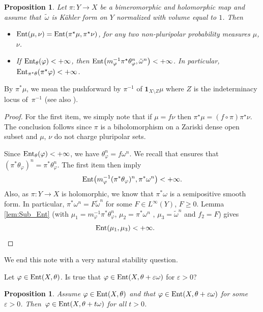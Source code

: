\documentclass[pdftex]{sigma}
\numberwithin{equation}{section}
\newtheorem{Proposition}[Theorem]{Proposition}
{ \theoremstyle{definition}
\newtheorem{Definition}[Theorem]{Definition}
\newtheorem{Note}[Theorem]{Note}
\newtheorem{Example}[Theorem]{Example}
\newtheorem{Remark}[Theorem]{Remark}
\newtheorem{Question}[Theorem]{Question}
}
\theoremstyle{plain}
\newcommand \Ent{{\rm Ent}}
\begin{document}
 \begin{Proposition}
 \label{lem:Holo}
 Let $\pi\colon Y\to X$ be a bimeromorphic and holomorphic map and assume that~$\tilde{\omega}$ is K\"ahler form on $Y$ normalized with volume equal to $1$. Then
 \begin{itemize}
 \item[$(i)$] $\Ent (\mu, \nu)=\Ent (\pi^\star \mu, \pi^\star \nu) $, for any two non-pluripolar probability measures $\mu$, $\nu$.
 \item[$(ii)$] If $\Ent_\theta(\varphi) <+\infty$, then $\Ent\big(m_\varphi^{-1} \pi^\star \theta^n_\varphi , \tilde{\omega}^n\big)<+\infty$. In particular, $\Ent_{\pi^\star \theta} (\pi^\star \varphi)<+\infty$.
 \end{itemize}
 \end{Proposition}
By $\pi^*\mu$, we mean the pushforward by $\pi^{-1}$ of $\mathbf{1}_{X\setminus Z}\mu$ where $Z$ is the indeterminacy locus of~$\pi^{-1}$ (see also \cite[lines after Definition~1.3]{BBEGZ19}).
 \begin{proof}
 For the first item, we simply note that if $\mu=f\nu$ then $\pi^\star \mu= (f\circ \pi) \pi^\star \nu$. The conclusion follows since $\pi$ is a biholomorphism on a Zariski dense open subset and $\mu$, $\nu$ do not charge pluripolar sets.

 Since $\Ent_\theta(\varphi)<+\infty$, we have $\theta_\varphi^n=f\omega^n$. We recall that \cite[Theorem~A]{DN14} ensures that $(\pi^*\theta_\varphi)^n= \pi^*\theta^n_\varphi$. The first item then imply
 \[
 \Ent\big(m_\varphi^{-1} (\pi^*\theta_\varphi)^n ,\pi^*\omega^n\big)<+\infty.
\]
 Also, as $\pi\colon Y\to X$ is holomorphic, we know that $\pi^*\omega$ is a semipositive smooth form. In particular, $\pi^*\omega^n=F \tilde{\omega}^n$ for some $F\in L^\infty(Y)$, $F\geq 0$. Lemma \ref{lem:Sub_Ent} (with $\mu_1=m_\varphi^{-1}\pi^*\theta^n_\varphi$, $\mu_2=\pi^*\omega^n$ , $\mu_3=\tilde{\omega}^n$ and $f_2=F$) gives
 \[
 \Ent(\mu_1, \mu_3 )<+\infty.\tag*{\qed}
 \] \renewcommand{\qed}{}
 \end{proof}

We end this note with a very natural stability question.

\begin{Question}
Let $\varphi \in \Ent(X, \theta)$. Is true that $\varphi \in \Ent(X, \theta+\varepsilon \omega)$ for $\varepsilon>0$?
\end{Question}

\begin{Proposition}\label{lemma: entropy all time}
Assume $\varphi \in \Ent(X, \theta)$ and that $\varphi \in \Ent(X, \theta+\varepsilon \omega)$ for some $\varepsilon>0$. Then~${\varphi \in \Ent(X, \theta+t\omega)}$ for all $t>0$.
\end{Proposition}
\end{document}
